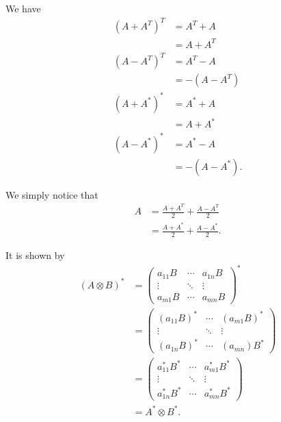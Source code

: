 \begin{solution}
  We have
  \begin{align*}
    (A + A^T)^T & = A^T + A\\
                & = A + A^T\\
    (A - A^T)^T & = A^T - A\\
                & = -(A - A^T)\\
    (A + A^*)^* & = A^* + A\\
                & = A + A^*\\
    (A - A^*)^* & = A^* - A\\
                & = -(A - A^*).
  \end{align*}
\end{solution}

\begin{solution}
  We simply notice that
  \begin{align*}
    A & = \frac{A + A^T}{2} + \frac{A - A^T}{2}\\
      & = \frac{A + A^*}{2} + \frac{A - A^*}{2}.
  \end{align*}
\end{solution}

\begin{solution}
  It is shown by
  \begin{align*}
    (A \otimes B)^*
    & =
    \begin{pmatrix}
      a_{11}B & \cdots & a_{1n}B\\
      \vdots  & \ddots & \vdots\\
      a_{m1}B & \cdots & a_{mn}B
    \end{pmatrix}^*\\
    & =
    \begin{pmatrix}
      (a_{11}B)^* & \cdots & (a_{m1}B)^*\\
      \vdots  & \ddots & \vdots\\
      (a_{1n}B)^* & \cdots & (a_{mn})B^*
    \end{pmatrix}\\
    & =
    \begin{pmatrix}
      a_{11}^*B^* & \cdots & a_{m1}^*B^*\\
      \vdots  & \ddots & \vdots\\
      a_{1n}^*B^* & \cdots & a_{mn}^*B^*
    \end{pmatrix}\\
    & =
    A^* \otimes B^*.
  \end{align*}
\end{solution}

